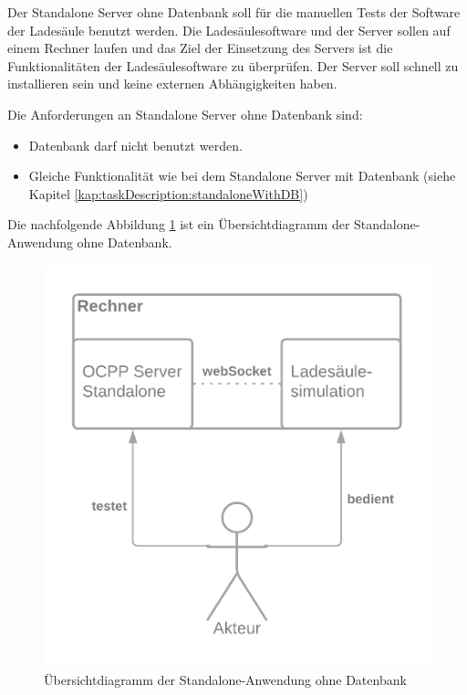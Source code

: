 Der Standalone Server ohne Datenbank soll für die manuellen Tests der Software der Ladesäule benutzt werden. 
Die Ladesäulesoftware und der Server sollen auf einem Rechner laufen und das Ziel der Einsetzung des Servers ist 
die Funktionalitäten der Ladesäulesoftware zu überprüfen. Der Server soll schnell zu installieren sein und keine externen 
Abhängigkeiten haben.

Die Anforderungen an Standalone Server ohne Datenbank sind:
\begin{itemize}
    \item Datenbank darf nicht benutzt werden.
    \item Gleiche Funktionalität wie bei dem Standalone Server mit Datenbank (siehe Kapitel \ref{kap:taskDescription:standaloneWithDB})
\end{itemize}

Die nachfolgende Abbildung \ref{fig:summaryDiagrammStandaloneWithoutDB} ist ein Übersichtdiagramm der Standalone-Anwendung ohne Datenbank.
\begin{figure}[H]
    \centering
    \includegraphics[width=1\textwidth]{./images/OCPP Server Standalone ohne DB.png}
    \caption[Übersichtdiagramm der Standalone-Anwendung ohne Datenbank]{Übersichtdiagramm der Standalone-Anwendung ohne Datenbank}
    \label{fig:summaryDiagrammStandaloneWithoutDB}
\end{figure}